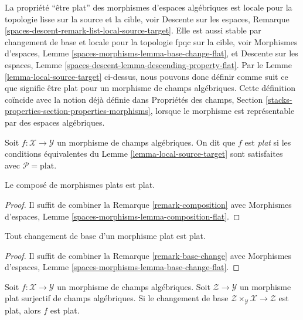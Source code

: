 \noindent
La propriété ``être plat'' des morphismes d'espaces algébriques est locale
pour la topologie lisse sur la source et la cible, voir Descente sur les
espaces, Remarque \ref{spaces-descent-remark-list-local-source-target}.
Elle est aussi stable par changement de base et locale pour la topologie fpqc
sur la cible, voir Morphismes d'espaces,
Lemme \ref{spaces-morphisms-lemma-base-change-flat}, et Descente sur les
espaces, Lemme
\ref{spaces-descent-lemma-descending-property-flat}.
Par le Lemme \ref{lemma-local-source-target} ci-dessus, nous pouvons donc
définir comme suit ce que signifie être plat pour un morphisme de champs
algébriques. Cette définition coïncide avec la notion déjà définie dans
Propriétés des champs,
Section \ref{stacks-properties-section-properties-morphisms}, lorsque le
morphisme est représentable par des espaces algébriques.

\begin{definition}
\label{definition-flat}
Soit $f : \mathcal{X} \to \mathcal{Y}$ un morphisme de champs algébriques.
On dit que $f$ est {\it plat} si les conditions équivalentes du
Lemme \ref{lemma-local-source-target} sont satisfaites avec
$\mathcal{P} = \text{plat}$.
\end{definition}

\begin{lemma}
\label{lemma-composition-flat}
Le composé de morphismes plats est plat.
\end{lemma}

\begin{proof}
Il suffit de combiner la Remarque \ref{remark-composition} avec Morphismes
d'espaces, Lemme
\ref{spaces-morphisms-lemma-composition-flat}.
\end{proof}

\begin{lemma}
\label{lemma-base-change-flat}
Tout changement de base d'un morphisme plat est plat.
\end{lemma}

\begin{proof}
Il suffit de combiner la Remarque \ref{remark-base-change} avec Morphismes
d'espaces, Lemme
\ref{spaces-morphisms-lemma-base-change-flat}.
\end{proof}

\begin{lemma}
\label{lemma-descent-flat}
Soit $f : \mathcal{X} \to \mathcal{Y}$ un morphisme de champs algébriques.
Soit $\mathcal{Z} \to \mathcal{Y}$ un morphisme plat surjectif de champs
algébriques. Si le changement de base
$\mathcal{Z} \times_\mathcal{Y} \mathcal{X} \to \mathcal{Z}$
est plat, alors $f$ est plat.
\end{lemma}

